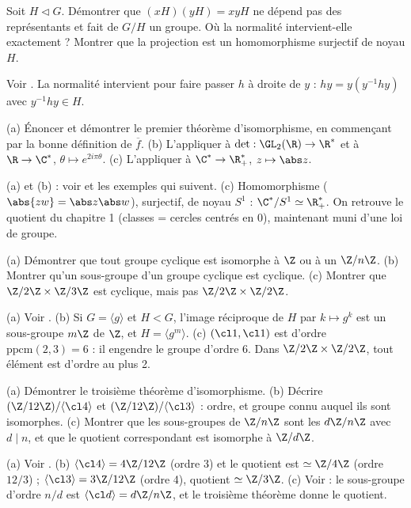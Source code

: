 \begin{exo}
Soit $H\lhd G$. Démontrer que $(xH)(yH)=xyH$ ne dépend pas des représentants et fait de $G/H$ un groupe. Où la normalité intervient-elle exactement ? Montrer que la projection est un homomorphisme surjectif de noyau $H$.
\begin{corrige}
Voir . La normalité intervient pour faire passer $h$ à droite de $y$ : $hy=y(y^{-1}hy)$ avec $y^{-1}hy\in H$.
\end{corrige}
\end{exo}
\begin{exo}
(a) Énoncer et démontrer le premier théorème d'isomorphisme, en commençant par la bonne définition de $\overline f$. (b) L'appliquer à $\det:\GL_2(\R)\to\R^*$ et à $\R\to\C^*$, $\theta\mapsto e^{2i\pi\theta}$. (c) L'appliquer à $\C^*\to\R_+^*$, $z\mapsto\abs z$.
\begin{corrige}
(a) et (b) : voir  et les exemples qui suivent. (c) Homomorphisme ($\abs{zw}=\abs z\abs w$), surjectif, de noyau $S^1$ : $\C^*/S^1\simeq\R_+^*$. On retrouve le quotient du chapitre 1 (classes = cercles centrés en 0), maintenant muni d'une loi de groupe.
\end{corrige}
\end{exo}
\begin{exo}
(a) Démontrer que tout groupe cyclique est isomorphe à $\Z$ ou à un $\Z/n\Z$. (b) Montrer qu'un sous-groupe d'un groupe cyclique est cyclique. (c) Montrer que $\Z/2\Z\times\Z/3\Z$ est cyclique, mais pas $\Z/2\Z\times\Z/2\Z$.
\begin{corrige}
(a) Voir . (b) Si $G=\langle g\rangle$ et $H<G$, l'image réciproque de $H$ par $k\mapsto g^k$ est un sous-groupe $m\Z$ de $\Z$, et $H=\langle g^m\rangle$. (c) $(\cl1,\cl1)$ est d'ordre $\mathrm{ppcm}(2,3)=6$ : il engendre le groupe d'ordre 6. Dans $\Z/2\Z\times\Z/2\Z$, tout élément est d'ordre au plus 2.
\end{corrige}
\end{exo}
\begin{exo}
(a) Démontrer le troisième théorème d'isomorphisme. (b) Décrire $(\Z/12\Z)/\langle\cl4\rangle$ et $(\Z/12\Z)/\langle\cl3\rangle$ : ordre, et groupe connu auquel ils sont isomorphes. (c) Montrer que les sous-groupes de $\Z/n\Z$ sont les $d\Z/n\Z$ avec $d\mid n$, et que le quotient correspondant est isomorphe à $\Z/d\Z$.
\begin{corrige}
(a) Voir . (b) $\langle\cl4\rangle=4\Z/12\Z$ (ordre 3) et le quotient est $\simeq\Z/4\Z$ (ordre $12/3$) ; $\langle\cl3\rangle=3\Z/12\Z$ (ordre 4), quotient $\simeq\Z/3\Z$. (c) Voir  : le sous-groupe d'ordre $n/d$ est $\langle\cl d\rangle=d\Z/n\Z$, et le troisième théorème donne le quotient.
\end{corrige}
\end{exo}
